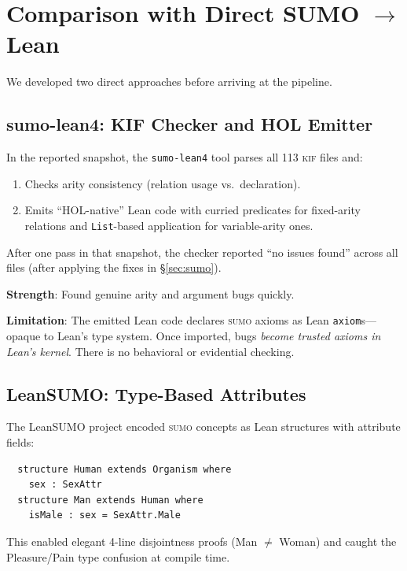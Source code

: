 \documentclass[11pt]{article}
\newcommand{\KIF}{\textsc{kif}}
\newcommand{\SUMO}{\textsc{sumo}}
\theoremstyle{definition}
\theoremstyle{plain}
\begin{document}
\section{Comparison with Direct SUMO $\to$ Lean}
\label{sec:comparison}

We developed two direct approaches before arriving at the pipeline.

\subsection{sumo-lean4: KIF Checker and HOL Emitter}

In the reported snapshot, the \texttt{sumo-lean4} tool parses all 113 \KIF{} files and:
\begin{enumerate}[nosep]
  \item Checks arity consistency (relation usage vs.\ declaration).
  \item Emits ``HOL-native'' Lean code with curried predicates for
    fixed-arity relations and \texttt{List}-based application for
    variable-arity ones.
\end{enumerate}

After one pass in that snapshot, the checker reported ``no issues found'' across all
files (after applying the fixes in \S\ref{sec:sumo}).

\textbf{Strength}: Found genuine arity and argument bugs quickly.

\textbf{Limitation}: The emitted Lean code declares \SUMO{} axioms
as Lean \texttt{axiom}s---opaque to Lean's type system.
Once imported, bugs \emph{become trusted axioms in Lean's kernel}.
There is no behavioral or evidential checking.

\subsection{LeanSUMO: Type-Based Attributes}

The LeanSUMO project encoded \SUMO{} concepts as Lean structures with
attribute fields:
\begin{verbatim}
  structure Human extends Organism where
    sex : SexAttr
  structure Man extends Human where
    isMale : sex = SexAttr.Male
\end{verbatim}

This enabled elegant 4-line disjointness proofs (Man $\neq$ Woman)
and caught the Pleasure/Pain type confusion at compile time.
\end{document}
